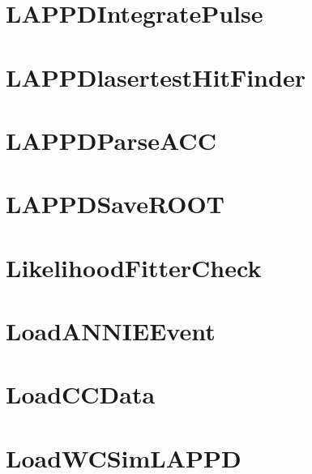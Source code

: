 \documentclass[twoside]{book}
\begin{document}
\chapter{L\-A\-P\-P\-D\-Integrate\-Pulse}
\label{md_UserTools_LAPPDIntegratePulse_README}
\hypertarget{md_UserTools_LAPPDIntegratePulse_README}{}

\chapter{L\-A\-P\-P\-Dlasertest\-Hit\-Finder}
\label{md_UserTools_LAPPDlasertestHitFinder_README}
\hypertarget{md_UserTools_LAPPDlasertestHitFinder_README}{}

\chapter{L\-A\-P\-P\-D\-Parse\-A\-C\-C}
\label{md_UserTools_LAPPDParseACC_README}
\hypertarget{md_UserTools_LAPPDParseACC_README}{}

\chapter{L\-A\-P\-P\-D\-Save\-R\-O\-O\-T}
\label{md_UserTools_LAPPDSaveROOT_README}
\hypertarget{md_UserTools_LAPPDSaveROOT_README}{}

\chapter{Likelihood\-Fitter\-Check}
\label{md_UserTools_LikelihoodFitterCheck_README}
\hypertarget{md_UserTools_LikelihoodFitterCheck_README}{}

\chapter{Load\-A\-N\-N\-I\-E\-Event}
\label{md_UserTools_LoadANNIEEvent_README}
\hypertarget{md_UserTools_LoadANNIEEvent_README}{}

\chapter{Load\-C\-C\-Data}
\label{md_UserTools_LoadCCData_README}
\hypertarget{md_UserTools_LoadCCData_README}{}

\chapter{Load\-W\-C\-Sim\-L\-A\-P\-P\-D}
\label{md_UserTools_LoadWCSimLAPPD_README}
\hypertarget{md_UserTools_LoadWCSimLAPPD_README}{}

\end{document}
